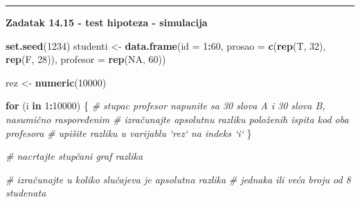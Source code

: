 \documentclass[]{book}
\newenvironment{Shaded}{\begin{snugshade}}{\end{snugshade}}
\newcommand{\KeywordTok}[1]{\textcolor[rgb]{0.13,0.29,0.53}{\textbf{#1}}}
\newcommand{\DataTypeTok}[1]{\textcolor[rgb]{0.13,0.29,0.53}{#1}}
\newcommand{\DecValTok}[1]{\textcolor[rgb]{0.00,0.00,0.81}{#1}}
\newcommand{\StringTok}[1]{\textcolor[rgb]{0.31,0.60,0.02}{#1}}
\newcommand{\CommentTok}[1]{\textcolor[rgb]{0.56,0.35,0.01}{\textit{#1}}}
\newcommand{\OtherTok}[1]{\textcolor[rgb]{0.56,0.35,0.01}{#1}}
\newcommand{\ControlFlowTok}[1]{\textcolor[rgb]{0.13,0.29,0.53}{\textbf{#1}}}
\newcommand{\OperatorTok}[1]{\textcolor[rgb]{0.81,0.36,0.00}{\textbf{#1}}}
\newcommand{\NormalTok}[1]{#1}
\theoremstyle{definition}
\theoremstyle{definition}
\theoremstyle{definition}
\theoremstyle{remark}
\begin{document}
\begin{center}\rule{0.5\linewidth}{\linethickness}\end{center}

\textbf{Zadatak 14.15 - test hipoteza - simulacija}

\begin{Shaded}
\begin{Highlighting}[]
\KeywordTok{set.seed}\NormalTok{(}\DecValTok{1234}\NormalTok{)}
\NormalTok{studenti <-}\StringTok{ }\KeywordTok{data.frame}\NormalTok{(}\DataTypeTok{id =} \DecValTok{1}\OperatorTok{:}\DecValTok{60}\NormalTok{, }\DataTypeTok{prosao =} \KeywordTok{c}\NormalTok{(}\KeywordTok{rep}\NormalTok{(T, }\DecValTok{32}\NormalTok{), }\KeywordTok{rep}\NormalTok{(F, }\DecValTok{28}\NormalTok{)),}
                       \DataTypeTok{profesor =} \KeywordTok{rep}\NormalTok{(}\OtherTok{NA}\NormalTok{, }\DecValTok{60}\NormalTok{))}

\NormalTok{rez <-}\StringTok{ }\KeywordTok{numeric}\NormalTok{(}\DecValTok{10000}\NormalTok{)}

\ControlFlowTok{for}\NormalTok{ (i }\ControlFlowTok{in} \DecValTok{1}\OperatorTok{:}\DecValTok{10000}\NormalTok{) \{}
  \CommentTok{# stupac profesor napunite sa 30 slova A i 30 slova B, nasumično raspoređenim}
  \CommentTok{# izračunajte apsolutnu razliku položenih ispita kod oba profesora}
  \CommentTok{# upišite razliku u varijablu `rez` na indeks `i`}
\NormalTok{\}}

\CommentTok{# nacrtajte stupčani graf razlika}


\CommentTok{# izračunajte u koliko slučajeva je apsolutna razlika}
\CommentTok{# jednaka ili veća broju od 8 studenata}
\end{Highlighting}
\end{Shaded}
\end{document}
